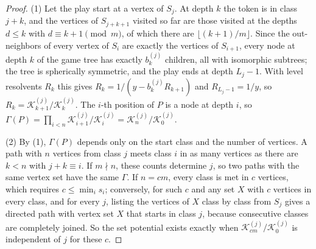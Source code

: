 \documentclass[11pt]{amsart}
\theoremstyle{plain}
\theoremstyle{definition}
\theoremstyle{remark}
\numberwithin{equation}{section}
\newcommand{\cont}{\mathcal{K}}           %
\begin{document}
\begin{proof}
(1) Let the play start at a vertex of $S_j$. At depth $k$ the token is in class $j+k$, and the vertices of $S_{j+k+1}$ visited so far are those visited at the depths $d\le k$ with $d\equiv k+1\pmod m$, of which there are $\lfloor(k+1)/m\rfloor$. Since the out-neighbors of every vertex of $S_i$ are exactly the vertices of $S_{i+1}$, every node at depth $k$ of the game tree has exactly $b^{(j)}_k$ children, all with isomorphic subtrees; the tree is spherically symmetric, and the play ends at depth $L_j-1$. With level resolvents $R_k$ this gives $R_k=1/(y-b^{(j)}_kR_{k+1})$ and $R_{L_j-1}=1/y$, so $R_k=\cont^{(j)}_{k+1}/\cont^{(j)}_k$. The $i$-th position of $P$ is a node at depth $i$, so $\Gamma(P)=\prod_{i<n}\cont^{(j)}_{i+1}/\cont^{(j)}_i=\cont^{(j)}_n/\cont^{(j)}_0$.

(2) By (1), $\Gamma(P)$ depends only on the start class and the number of vertices. A path with $n$ vertices from class $j$ meets class $i$ in as many vertices as there are $k<n$ with $j+k\equiv i$. If $m\nmid n$, these counts determine $j$, so two paths with the same vertex set have the same $\Gamma$. If $n=cm$, every class is met in $c$ vertices, which requires $c\le\min_is_i$; conversely, for such $c$ and any set $X$ with $c$ vertices in every class, and for every $j$, listing the vertices of $X$ class by class from $S_j$ gives a directed path with vertex set $X$ that starts in class $j$, because consecutive classes are completely joined. So the set potential exists exactly when $\cont^{(j)}_{cm}/\cont^{(j)}_0$ is independent of $j$ for these $c$.
\end{proof}
\end{document}
